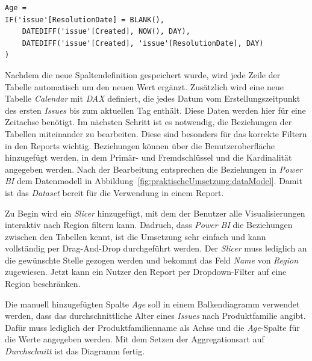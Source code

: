 \begin{lstlisting}[frame=single,caption=Code zur Defintion der Spalte \textit{Age} von Tabelle \textit{Issue},captionpos=b]
Age = 
IF('issue'[ResolutionDate] = BLANK(),
    DATEDIFF('issue'[Created], NOW(), DAY),   
    DATEDIFF('issue'[Created], 'issue'[ResolutionDate], DAY)
)
\end{lstlisting}

\noindent Nachdem die neue Spaltendefinition gespeichert wurde, wird jede Zeile der Tabelle automatisch um den neuen Wert ergänzt. Zusätzlich wird eine neue Tabelle \textit{Calendar} mit \textit{DAX} definiert, die jedes Datum vom Erstellungszeitpunkt des ersten \textit{Issues} bis zum aktuellen Tag enthält. Diese Daten werden hier für eine Zeitachse benötigt. Im nächsten Schritt ist es notwendig, die Beziehungen der Tabellen miteinander zu bearbeiten. Diese sind besonders für das korrekte Filtern in den Reports wichtig. Beziehungen können über die Benutzeroberfläche hinzugefügt werden, in dem Primär- und Fremdschlüssel und die Kardinalität angegeben werden. Nach der Bearbeitung entsprechen die Beziehungen in \textit{Power BI} dem Datenmodell in Abbildung~\ref{fig:praktischeUmsetzung:dataModel}. Damit ist das \textit{Dataset} bereit für die Verwendung in einem Report.

Zu Begin wird ein \textit{Slicer} hinzugefügt, mit dem der Benutzer alle Visualisierungen interaktiv nach Region filtern kann. Dadruch, dass \textit{Power BI} die Beziehungen zwischen den Tabellen kennt, ist die Umsetzung sehr einfach und kann vollständig per Drag-And-Drop durchgeführt werden. Der \textit{Slicer} muss lediglich an die gewünschte Stelle gezogen werden und bekommt das Feld \textit{Name} von \textit{Region} zugewiesen. Jetzt kann ein Nutzer den Report per Dropdown-Filter auf eine Region beschränken.

Die manuell hinzugefügten Spalte \textit{Age} soll in einem Balkendiagramm verwendet werden, dass das durchschnittliche Alter eines \textit{Issues} nach Produktfamilie angibt. Dafür muss lediglich der Produktfamilienname als Achse und die \textit{Age}-Spalte für die Werte angegeben werden. Mit dem Setzen der Aggregationsart auf \textit{Durchschnitt} ist das Diagramm fertig.

